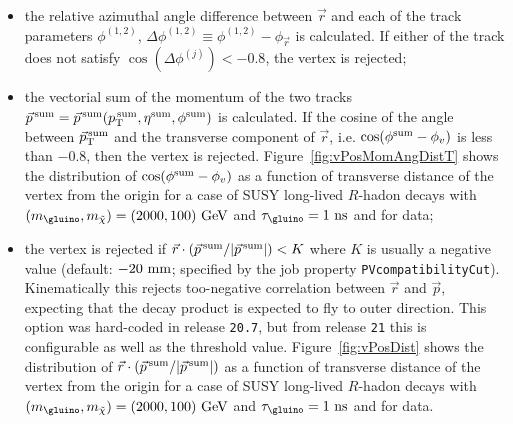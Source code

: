 \documentclass[NOTE, atlasdraft=true, texlive=2018, UKenglish]{\ATLASLATEXPATH atlasdoc}
\begin{document}
\begin{itemize}
\item the relative azimuthal angle difference between $\vec{r}$ and each of the track parameters $\phi^{(1,2)}$, $\varDelta\phi^{(1,2)}\equiv \phi^{(1,2)}-\phi_{\vec{r}}$ is calculated. If either of the track does not satisfy $\cos(\varDelta\phi^{(j)})< -0.8$, the vertex is rejected;
\item the vectorial sum of the momentum of the two tracks $\vec{p}^{\rm\,sum} = \vec{p}^{\rm\,sum}(p_{\rm T}^{\rm\,sum}, \eta^{\rm sum}, \phi^{\rm sum})$ is calculated. If the cosine of the angle between $\vec{p}_{\rm T}^{\rm\,sum}$ and the transverse component of $\vec{r}$, i.e. $\cos(\phi^{\rm sum}-\phi_{v})$ is less than $-0.8$, then the vertex is rejected. Figure~\ref{fig:vPosMomAngDistT} shows the distribution of $\cos(\phi^{\rm sum}-\phi_{v})$ as a function of transverse distance of the vertex from the origin for a case of SUSY long-lived $R$-hadon decays with $(m_{\gluino}, m_{\tilde{\chi}}) = (2000, 100)~{\rm GeV}$ and $\tau_{\gluino} = 1~{\rm ns}$ and for data;
\item the vertex is rejected if $\vec{r}\cdot(\vec{p}^{\rm\,sum}/|\vec{p}^{\rm \,sum}|) < K$ where $K$ is usually a negative value (default: $-20~{\rm mm}$; specified by the job property {\tt PVcompatibilityCut}). Kinematically this rejects too-negative correlation between $\vec{r}$ and $\vec{p}$, expecting that the decay product is expected to fly to outer direction. This option was hard-coded in release {\tt 20.7}, but from release {\tt 21} this is configurable as well as the threshold value. Figure~\ref{fig:vPosDist} shows the distribution of $\vec{r}\cdot(\vec{p}^{\rm\,sum}/|\vec{p}^{\rm \,sum}|)$ as a function of transverse distance of the vertex from the origin for a case of SUSY long-lived $R$-hadon decays with $(m_{\gluino}, m_{\tilde{\chi}}) = (2000, 100)~{\rm GeV}$ and $\tau_{\gluino} = 1~{\rm ns}$ and for data.
\end{itemize}
\end{document}
